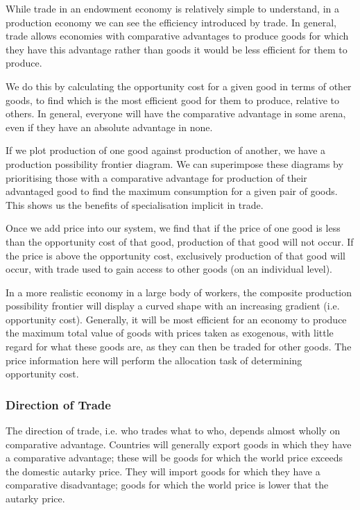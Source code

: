 \documentclass[12pt]{report}
\begin{document}
\begin{flushleft}
While trade in an endowment economy is relatively simple to understand, in a
production economy we can see the efficiency introduced by trade. In general,
trade allows economies with comparative advantages to produce goods for which
they have this advantage rather than goods it would be less efficient for them
to produce. \par
We do this by calculating the opportunity cost for a given good in terms of
other goods, to find which is the most efficient good for them to produce,
relative to others. In general, everyone will have the comparative advantage in
some arena, even if they have an absolute advantage in none. \par
If we plot production of one good against production of another, we have a
production possibility frontier diagram. We can superimpose these diagrams by
prioritising those with a comparative advantage for production of their
advantaged good to find the maximum consumption for a given pair of goods. This
shows us the benefits of specialisation implicit in trade. \par
Once we add price into our system, we find that if the price of one good is
less than the opportunity cost of that good, production of that good will not
occur. If the price is above the opportunity cost, exclusively production of
that good will occur, with trade used to gain access to other goods (on an
individual level). \par
In a more realistic economy in a large body of workers, the composite
production possibility frontier will display a curved shape with an increasing
gradient (i.e. opportunity cost). Generally, it will be most efficient for an
economy to produce the maximum total value of goods with prices taken as
exogenous, with little regard for what these goods are, as they can then be
traded for other goods. The price information here will perform the allocation
task of determining opportunity cost.

\subsubsection*{Direction of Trade}

The direction of trade, i.e. who trades what to who, depends almost wholly on
comparative advantage. Countries will generally export goods in which they have
a comparative advantage; these will be goods for which the world price exceeds
the domestic autarky price. They will import goods for which they have a
comparative disadvantage; goods for which the world price is lower that the
autarky price.


\end{flushleft}
\end{document}
